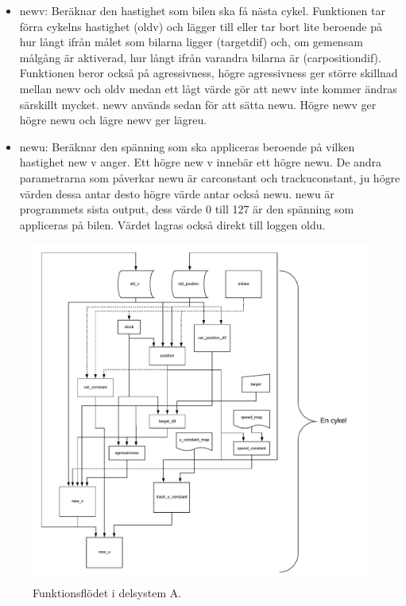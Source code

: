 \begin{itemize}
\item new\textunderscore v: Beräknar den hastighet som bilen ska få nästa cykel. Funktionen tar förra cykelns hastighet (old\textunderscore v) 
och lägger till eller tar bort lite beroende på hur långt ifrån målet som bilarna ligger (target\textunderscore dif) och, om gemensam
målgång är aktiverad, hur långt ifrån varandra bilarna är (car\textunderscore position\textunderscore dif). Funktionen beror 
också på agressivness, högre agressivness ger större skillnad mellan new\textunderscore v och old\textunderscore v medan ett lågt värde gör att new\textunderscore v 
inte kommer ändras särskillt mycket.
new\textunderscore v används sedan för att sätta
new\textunderscore u. Högre new\textunderscore v ger högre new\textunderscore u och lägre new\textunderscore v ger lägre\textunderscore u. 
      \item new\textunderscore u: Beräknar den spänning som ska appliceras beroende på vilken hastighet new \textunderscore v anger. Ett högre new \textunderscore v innebär ett högre new\textunderscore u. De andra parametrarna som påverkar new\textunderscore u är car\textunderscore constant och track\textunderscore u\textunderscore constant, ju högre värden dessa antar desto högre värde antar också new\textunderscore u. new\textunderscore u är programmets sista output, dess värde 0 till 127 är den spänning som appliceras på bilen. Värdet lagras också direkt till loggen old\textunderscore u. 

    \end{itemize}

    \begin{figure}
      \centering
      \includegraphics[width=\linewidth]{figures/flow.pdf}
      \caption{Funktionsflödet i delsystem A.}%
      \label{fig:flow_diagram}
    \end{figure}

